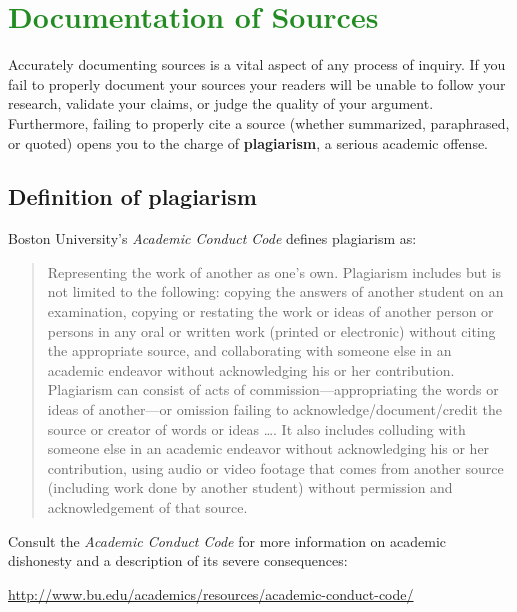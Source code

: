 

\section{\textcolor{ForestGreen}{Documentation of Sources}}

Accurately documenting sources is a vital aspect of any process of inquiry. If you fail to properly document your sources your readers will be unable to follow your research, validate your claims, or judge the quality of your argument. Furthermore, failing to properly cite a source (whether summarized, paraphrased, or quoted) opens you to the charge of \textbf{plagiarism}, a serious academic offense.

\subsection{Definition of plagiarism}

Boston University's \emph{Academic Conduct Code} defines plagiarism as:

\begin{quote}Representing the work of another as one's own. Plagiarism includes but is not limited to the following: copying the answers of another student on an examination, copying or restating the work or ideas of another person or persons in any oral or written work (printed or electronic) without citing the appropriate source, and collaborating with someone else in an academic endeavor without acknowledging his or her contribution. Plagiarism can consist of acts of commission---appropriating the words or ideas of another---or omission failing to acknowledge/document/credit the source or creator of words or ideas \dots. It also includes colluding with someone else in an academic endeavor without acknowledging his or her contribution, using audio or video footage that comes from another source (including work done by another student) without permission and acknowledgement of that source.
\end{quote}
Consult the \emph{Academic Conduct Code} for more information on academic dishonesty and a description of its severe consequences:

\tab \url{http://www.bu.edu/academics/resources/academic-conduct-code/}


